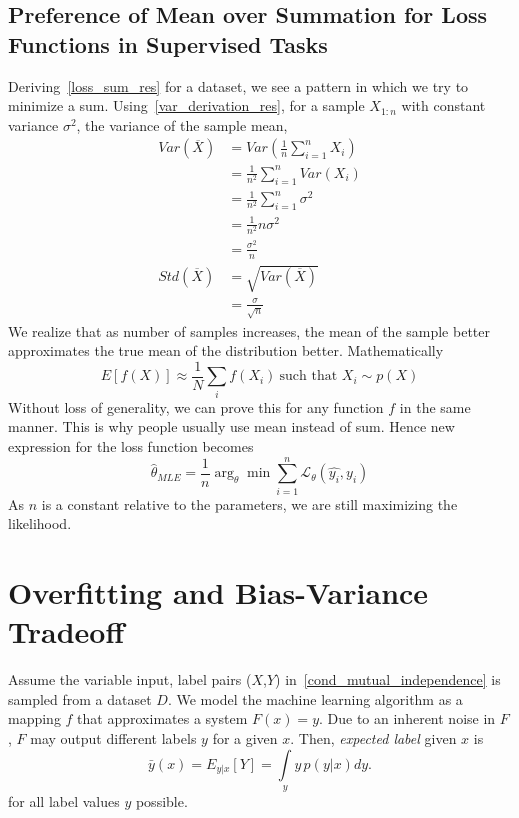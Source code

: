 \documentclass{book}
\numberwithin{equation}{subsection}
\begin{document}
\subsection{Preference of Mean over Summation for Loss Functions in Supervised Tasks}
\label{mean_loss}
Deriving~\ref{loss_sum_res} for a dataset, we see a pattern in which we try to minimize a sum.
Using~\ref{var_derivation_res}, for a sample $X_{1:n}$ with constant variance $\sigma^2$, the variance of the sample mean,
\begin{align}
    Var(\overline{X}) &= Var(\frac{1}{n}\sum_{i=1}^{n} X_i)\\
    &= \frac{1}{n^2} \sum_{i=1}^{n} Var(X_i)\\
    &= \frac{1}{n^2} \sum_{i=1}^{n} \sigma^2\\
    &= \frac{1}{n^2} n \sigma^2\\
    &= \frac{\sigma^2}{n}\\
    Std(\overline{X}) &= \sqrt{Var(\overline{X})}\\
    &= \frac{\sigma}{\sqrt{n}}
\end{align}
We realize that as number of samples increases, the mean of the sample better approximates the true mean of the distribution better. Mathematically
\begin{equation}
    E[f(X)] \approx \frac{1}{N}\sum_i f(X_i)\ \text{such that $X_i \sim p(X)$}\label{mean_loss_res}
\end{equation}
Without loss of generality, we can prove this for any function $f$ in the same manner. This is why people usually use mean instead of sum. Hence new expression for the loss function becomes 
\begin{equation}
    \hat{\theta}_{MLE} = \frac{1}{n}\arg_\theta \min \sum_{i=1}^n \mathcal{L}_\theta(\hat{y_i},y_i)
\end{equation}
As $n$ is a constant relative to the parameters, we are still maximizing the likelihood. 
\section{Overfitting and Bias-Variance Tradeoff}

Assume the variable input, label pairs ($X$,$Y$) in~\ref{cond_mutual_independence} is sampled from a dataset $D$. We model the machine learning algorithm as a mapping $f$ that approximates a system $F(x)=y$. Due to an inherent noise in $F$, $F$ may output different labels $y$ for a given $x$. Then, \textit{expected label} given $x$ is
\begin{equation}
    \bar{y}(x) = E_{y \vert x} \left[Y\right] = \int\limits_y y \, p(y \vert x) dy.
\end{equation}
for all label values $y$ possible.
\end{document}
